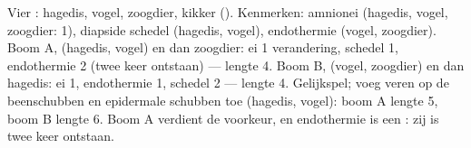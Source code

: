\begin{example}\label{ex:b1:classifying-biodiversity:count}
Vier : hagedis, vogel, zoogdier, kikker (). Kenmerken:
amnionei (hagedis, vogel, zoogdier: 1), diapside schedel (hagedis, vogel),
endothermie (vogel, zoogdier). Boom A, (hagedis, vogel) en dan zoogdier: ei 1
verandering, schedel 1, endothermie 2 (twee keer ontstaan) --- lengte 4. Boom
B, (vogel, zoogdier) en dan hagedis: ei 1, endothermie 1, schedel 2 ---
lengte 4. Gelijkspel; voeg veren op de beenschubben en epidermale schubben
toe (hagedis, vogel): boom A lengte 5, boom B lengte 6. Boom A verdient de
voorkeur, en endothermie is een : zij is twee keer ontstaan.
\end{example}


